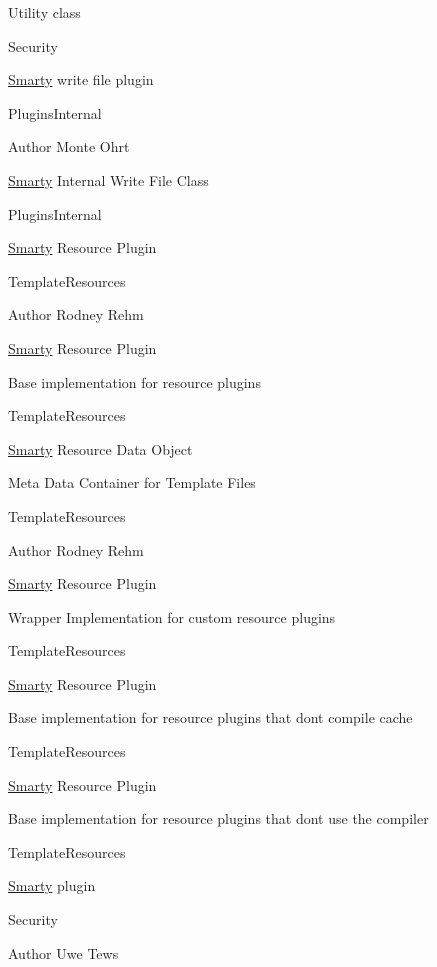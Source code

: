 Utility class

Security

\hyperlink{class_smarty}{Smarty} write file plugin

Plugins\+Internal \begin{DoxyAuthor}{Author}
Monte Ohrt
\end{DoxyAuthor}
\hyperlink{class_smarty}{Smarty} Internal Write File Class

Plugins\+Internal

\hyperlink{class_smarty}{Smarty} Resource Plugin

Template\+Resources \begin{DoxyAuthor}{Author}
Rodney Rehm
\end{DoxyAuthor}
\hyperlink{class_smarty}{Smarty} Resource Plugin

Base implementation for resource plugins

Template\+Resources

\hyperlink{class_smarty}{Smarty} Resource Data Object

Meta Data Container for Template Files

Template\+Resources \begin{DoxyAuthor}{Author}
Rodney Rehm
\end{DoxyAuthor}
\hyperlink{class_smarty}{Smarty} Resource Plugin

Wrapper Implementation for custom resource plugins

Template\+Resources

\hyperlink{class_smarty}{Smarty} Resource Plugin

Base implementation for resource plugins that don\textquotesingle{}t compile cache

Template\+Resources

\hyperlink{class_smarty}{Smarty} Resource Plugin

Base implementation for resource plugins that don\textquotesingle{}t use the compiler

Template\+Resources

\hyperlink{class_smarty}{Smarty} plugin

Security \begin{DoxyAuthor}{Author}
Uwe Tews 
\end{DoxyAuthor}
